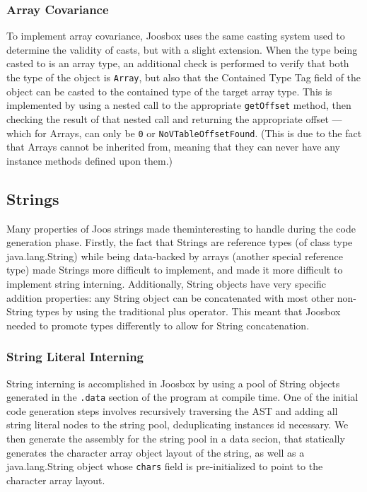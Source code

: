 \documentclass[letterpaper]{article}
\begin{document}
  \subsubsection{Array Covariance}

  To implement array covariance, Joosbox uses the same casting system used to
  determine the validity of casts, but with a slight extension. When the type
  being casted to is an array type, an additional check is performed to verify
  that both the type of the object is {\tt Array}, but also that the Contained
  Type Tag field of the object can be casted to the contained type of the
  target array type. This is implemented by using a nested call to the
  appropriate {\tt getOffset} method, then checking the result of that nested
  call and returning the appropriate offset --- which for Arrays, can only be
  {\tt 0} or {\tt NoVTableOffsetFound}. (This is due to the fact that Arrays
  cannot be inherited from, meaning that they can never have any instance
  methods defined upon them.)

  \subsection{Strings}

  Many properties of Joos strings made theminteresting to handle during the
  code generation phase. Firstly, the fact that Strings are reference types
  (of class type java.lang.String) while being data-backed by arrays (another
  special reference type) made Strings more difficult to implement, and made
  it more difficult to implement string interning. Additionally, String
  objects have very specific addition properties: any String object can be
  concatenated with most other non-String types by using the traditional plus
  operator. This meant that Joosbox needed to promote types differently to
  allow for String concatenation.

  \subsubsection{String Literal Interning}

  String interning is accomplished in Joosbox by using a pool of String
  objects generated in the {\tt .data} section of the program at compile time.
  One of the initial code generation steps involves recursively traversing the
  AST and adding all string literal nodes to the string pool, deduplicating
  instances id necessary. We then generate the assembly for the string pool in
  a data secion, that statically generates the character array object layout
  of the string, as well as a java.lang.String object whose {\tt chars} field
  is pre-initialized to point to the character array layout.
\end{document}

